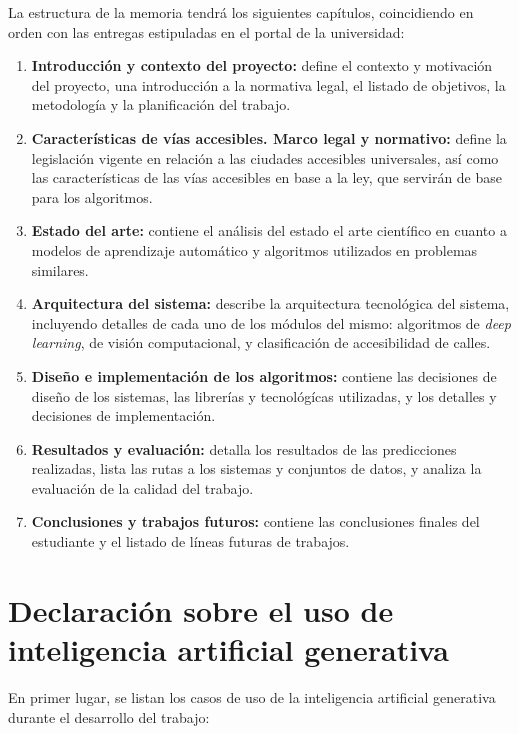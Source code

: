 La estructura de la memoria tendrá los siguientes capítulos, coincidiendo en orden con las entregas estipuladas en el portal de la universidad:

\begin{enumerate}
    \item \textbf{Introducción y contexto del proyecto:} define el contexto y motivación del proyecto, una introducción a la normativa legal, el listado de objetivos, la metodología y la planificación del trabajo.
    \item \textbf{Características de vías accesibles. Marco legal y normativo:} define la legislación vigente en relación a las ciudades accesibles universales, así como las características de las vías accesibles en base a la ley, que servirán de base para los algoritmos.
    \item \textbf{Estado del arte:} contiene el análisis del estado el arte científico en cuanto a modelos de aprendizaje automático y algoritmos utilizados en problemas similares.
    \item \textbf{Arquitectura del sistema:} describe la arquitectura tecnológica del sistema, incluyendo detalles de cada uno de los módulos del mismo: algoritmos de \textit{deep learning}, de visión computacional, y clasificación de accesibilidad de calles.
    \item \textbf{Diseño e implementación de los algoritmos:} contiene las decisiones de diseño de los sistemas, las librerías y tecnológícas utilizadas, y los detalles y decisiones de implementación.
    \item \textbf{Resultados y evaluación:} detalla los resultados de las predicciones realizadas, lista las rutas a los sistemas y conjuntos de datos, y analiza la evaluación de la calidad del trabajo.
    \item \textbf{Conclusiones y trabajos futuros:} contiene las conclusiones finales del estudiante y el listado de líneas futuras de trabajos.
\end{enumerate}

\section{Declaración sobre el uso de inteligencia artificial generativa}

En primer lugar, se listan los casos de uso de la inteligencia artificial generativa durante el desarrollo del trabajo:

